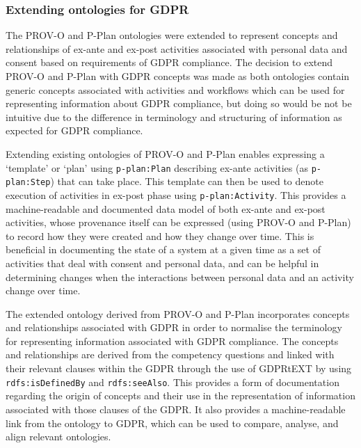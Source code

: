 \subsubsection{Extending ontologies for GDPR}
The PROV-O and P-Plan ontologies were extended to represent concepts and relationships of ex-ante and ex-post activities associated with personal data and consent based on requirements of GDPR compliance.
The decision to extend PROV-O and P-Plan with GDPR concepts was made as both ontologies contain generic concepts associated with activities and workflows which can be used for representing information about GDPR compliance, but doing so would be not be intuitive due to the difference in terminology and structuring of information as expected for GDPR compliance.

Extending existing ontologies of PROV-O and P-Plan enables expressing a `template'
or `plan' using \texttt{p-plan:Plan} describing ex-ante activities (as \texttt{p-plan:Step}) that can take place. This template can then be used to denote execution of activities in ex-post phase using \texttt{p-plan:Activity}.
This provides a machine-readable and documented data model of both ex-ante and ex-post activities, whose provenance itself can be expressed (using PROV-O and P-Plan) to record how they were created and how they  change over time.
This is beneficial in documenting the state of a system at a given time as a set of activities that deal with consent and personal data, and
can be helpful in determining changes when the interactions between personal data and an activity change over time.

The extended ontology derived from PROV-O and P-Plan incorporates concepts and relationships associated with GDPR in order to normalise the terminology for representing information associated with GDPR compliance.
The concepts and relationships are derived from the competency questions and linked with their relevant clauses within the GDPR through the use of GDPRtEXT by using \texttt{rdfs:isDefinedBy} and \texttt{rdfs:seeAlso}.
This provides a form of documentation regarding the origin of concepts and their use in the representation of information associated with those clauses of the GDPR.
It also provides a machine-readable link from the ontology to GDPR, which can be used to compare, analyse, and align relevant ontologies.

